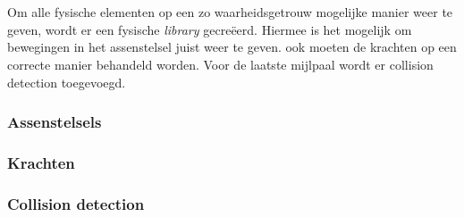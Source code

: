 \\
\\
Om alle fysische elementen op een zo waarheidsgetrouw mogelijke manier weer te geven, wordt er een fysische \textit{library} gecre\"eerd. Hiermee is het mogelijk om bewegingen in het assenstelsel juist weer te geven. ook moeten de krachten op een correcte manier behandeld worden. Voor de laatste mijlpaal wordt er collision detection toegevoegd. 
\subsubsection{Assenstelsels}
\label{subsec: Assenstelsels}


\subsubsection{Krachten}
\label{subsec: Krachten}


\subsubsection{Collision detection}
\label{subsec: Collision detection}

